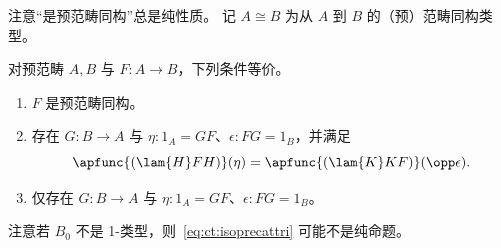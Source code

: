 注意“是预范畴同构”总是纯性质。
记 $A\cong B$ 为从 $A$ 到 $B$ 的（预）范畴同构类型。

\begin{lem}\label{ct:isoprecat}
  对预范畴 $A,B$ 与 $F:A\to B$，下列条件等价。
  \begin{enumerate}
  \item $F$ 是预范畴同构。\label{item:ct:ipc1}
  \item 存在 $G:B\to A$ 与 $\eta:1_A = GF$、$\epsilon:FG=1_B$，并满足\label{item:ct:ipc2}
    \begin{equation}
      \apfunc{(\lam{H} F H)}({\eta}) = \apfunc{(\lam{K} K F)}({\opp\epsilon}).\label{eq:ct:isoprecattri}
    \end{equation}
  \item 仅存在 $G:B\to A$ 与 $\eta:1_A = GF$、$\epsilon:FG=1_B$。\label{item:ct:ipc3}
  \end{enumerate}
\end{lem}

注意若 $B_0$ 不是 1-类型，则~\eqref{eq:ct:isoprecattri} 可能不是纯命题。

